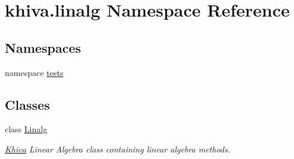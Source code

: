 \hypertarget{namespacekhiva_1_1linalg}{}\section{khiva.\+linalg Namespace Reference}
\label{namespacekhiva_1_1linalg}
\subsection*{Namespaces}
\begin{DoxyCompactItemize}
\item 
namespace \mbox{\hyperlink{namespacekhiva_1_1linalg_1_1tests}{tests}}
\end{DoxyCompactItemize}
\subsection*{Classes}
\begin{DoxyCompactItemize}
\item 
class \mbox{\hyperlink{classkhiva_1_1linalg_1_1_linalg}{Linalg}}
\begin{DoxyCompactList}\small\item\em \mbox{\hyperlink{classkhiva_1_1_khiva}{Khiva}} Linear Algebra class containing linear algebra methods. \end{DoxyCompactList}\end{DoxyCompactItemize}
